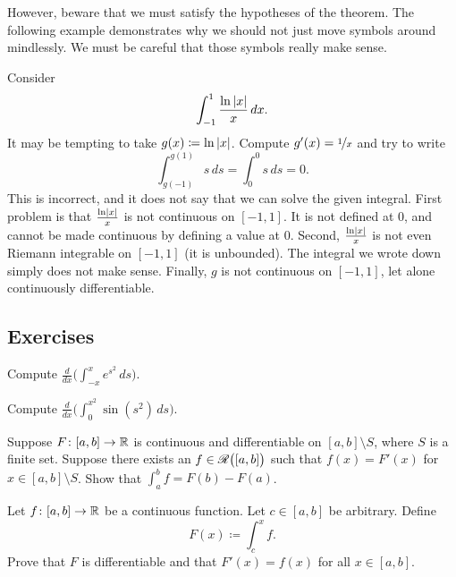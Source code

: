 However, beware that we must satisfy the hypotheses of the theorem.  The
following example demonstrates why we should not just 
move symbols around mindlessly.
We must be careful that those symbols really make sense.

\begin{example}
Consider
\begin{equation*}
\int_{-1}^{1} \frac{\ln \left\lvert {x} \right\rvert}{x} \,dx .
\end{equation*}
It may be tempting to take $g(x) \coloneqq \ln \left\lvert {x} \right\rvert$.  Compute $g'(x) =
\nicefrac{1}{x}$ and try to write
\begin{equation*}
\int_{g(-1)}^{g(1)} s \,ds = 
\int_{0}^{0} s \,ds = 0. 
\end{equation*}
This  is incorrect, and it does not say
that we can solve the given integral.  First problem is that
$\frac{\ln \left\lvert {x} \right\rvert}{x}$ is not continuous on $[-1,1]$.
It is not defined at 0, and cannot be made continuous by defining a value at
0.
Second, $\frac{\ln \left\lvert {x} \right\rvert}{x}$ is not even Riemann integrable on $[-1,1]$
(it is unbounded).
The integral we wrote down simply does not make sense.
Finally, $g$ is not continuous 
on $[-1,1]$, let alone continuously differentiable.
\end{example}

\subsection{Exercises}

\begin{exercise}
Compute
$\displaystyle
\frac{d}{dx} \biggl( \int_{-x}^x e^{s^2}\,ds \biggr)$.
\end{exercise}

\begin{exercise}
Compute
$\displaystyle
\frac{d}{dx} \biggl( \int_{0}^{x^2} \sin(s^2)\,ds \biggr)$.
\end{exercise}

\begin{exercise}
Suppose $F \colon [a,b] \to {\mathbb{R}}$ is continuous and differentiable
on $[a,b] \setminus S$, where $S$ is a finite set.  Suppose there
exists an $f \in {\mathscr{R}}\bigl([a,b]\bigr)$ such that $f(x) = F'(x)$ for $x \in [a,b]
\setminus S$.  Show that
$\int_a^b f = F(b)-F(a)$.
\end{exercise}

\begin{exercise} \label{secondftc:exercise}
Let $f \colon [a,b] \to {\mathbb{R}}$ be a continuous function.  Let $c \in [a,b]$
be arbitrary.  Define
\begin{equation*}
F(x) \coloneqq \int_c^x f .
\end{equation*}
Prove that $F$ is differentiable and that $F'(x) = f(x)$ for all $x \in
[a,b]$.
\end{exercise}

